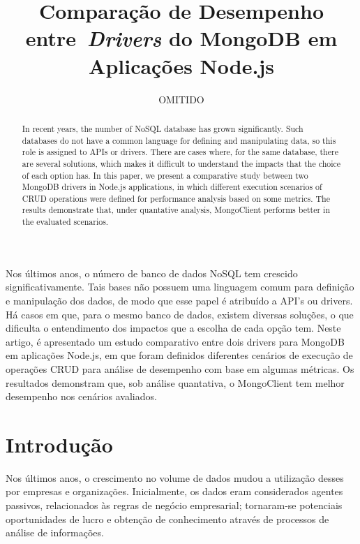 \documentclass[12pt]{article}
\title{Comparação de Desempenho entre~\emph{Drivers} do MongoDB em Aplicações Node.js}
\author{OMITIDO}
\begin{document}
 

\maketitle

\begin{abstract}
In recent years, the number of NoSQL database has grown significantly. Such databases do not have a common language for defining and manipulating data, so this role is assigned to APIs or drivers. There are cases where, for the same database, there are several solutions, which makes it difficult to understand the impacts that the choice of each option has. In this paper, we present a comparative study between two MongoDB drivers in Node.js applications, in which different execution scenarios of CRUD operations were defined for performance analysis based on some metrics. The results demonstrate that, under quantative analysis, MongoClient performs better in the evaluated scenarios.
\end{abstract}
     
\begin{resumo} 
Nos últimos anos, o número de banco de dados NoSQL tem crescido significativamente. Tais bases não possuem uma linguagem comum para definição e manipulação dos dados, de modo que esse papel é atribuído a API's ou drivers. Há casos em que, para o mesmo banco de dados, existem diversas soluções, o que dificulta o entendimento dos impactos que a escolha de cada opção tem. Neste artigo, é apresentado um estudo comparativo entre dois drivers para MongoDB em aplicações Node.js, em que foram definidos diferentes cenários de execução de operações CRUD para análise de desempenho com base em algumas métricas. Os resultados demonstram que, sob análise quantativa, o MongoClient tem melhor desempenho nos cenários avaliados.
\end{resumo}


\section{Introdução}

Nos últimos anos, o crescimento no volume de dados mudou a utilização desses por empresas e organizações. Inicialmente, os dados eram considerados agentes passivos, relacionados às regras de negócio empresarial; tornaram-se potenciais oportunidades de lucro e obtenção de conhecimento através de processos de análise de informações.
\end{document}
